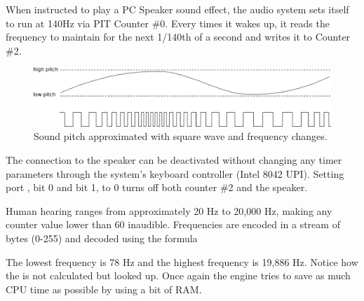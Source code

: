 \documentclass[book.tex]{subfiles}
\begin{document}
\par
When instructed to play a PC Speaker sound effect, the audio system sets itself to run at 140Hz via PIT Counter \#0. Every times it wakes up, it reads the frequency to maintain for the next 1/140th of a second and writes it to Counter \#2.\\

\par
\begin{figure}[H]
  \centering
  \includegraphics[width=\textwidth]{imgs/drawings/square_waves.eps}
  \caption{Sound pitch approximated with square wave and frequency changes.}
\end{figure}

\par
The connection to the speaker can be deactivated without changing any timer parameters through the system's keyboard controller (Intel 8042 UPI). Setting port , bit 0 and bit 1, to 0 turns off both counter \#2 and the speaker.\\

\par
\begin{minipage}{\textwidth}

\end{minipage}

\par
Human hearing ranges from approximately 20 Hz to 20,000 Hz, making any counter value lower than 60 inaudible. Frequencies are encoded in a stream of bytes (0-255) and decoded using the formula\\

\par
\begin{minipage}{\textwidth}

\end{minipage}

\par
The lowest frequency is 78 Hz and the highest frequency is 19,886 Hz. Notice how the  is not calculated but looked up. Once again the engine tries to save as much CPU time as possible by using a bit of RAM.\\

\par
\begin{minipage}{\textwidth}

\end{minipage}
\par
\end{document}
